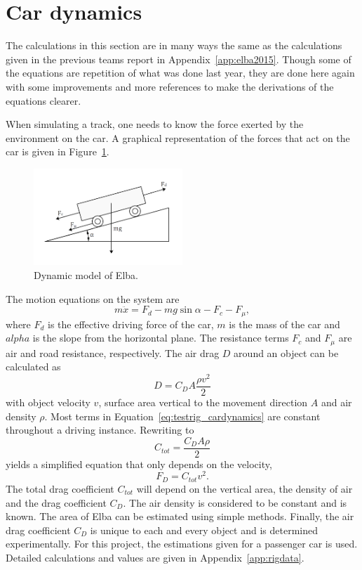 \section{Car dynamics}\label{sec:cardynamics}
The calculations in this section are in many ways the same as the calculations
given in the previous teams report in Appendix~\ref{app:elba2015}. Though some
of the equations are repetition of what was done last year, they are
done here again with some improvements and more references to make the
derivations of the equations clearer.

When simulating a track, one needs to know the force exerted by the environment
on the car. A graphical representation of the forces that act on the car is
given in Figure~\ref{fig:testrig_elbadynamics}.
\begin{figure}[H]
    \centering
    \includegraphics[width=0.5\textwidth]{./img/testrig_elbaforces.png}
    \caption{Dynamic model of Elba.}\label{fig:testrig_elbadynamics}
\end{figure}
The motion equations on the system are 
\begin{equation} \label{eq:testrig_cardynamics}
    m\ddot{x} = F_d - mg\sin{\alpha} - F_c - F_{\mu},
\end{equation}
where $F_d$ is the effective driving force of the car, $m$ is the mass of the
car and $alpha$ is the slope from the horizontal plane. The resistance terms
$F_c$ and $F_{\mu}$ are air and road resistance, respectively. The air drag $D$
around an object can be calculated as~\cite{nakayama2002}
\begin{equation} \label{eq:testrig_airdrag}
    D = C_D A \frac{\rho v^2} {2}
\end{equation}
with object velocity $v$, surface area vertical to the movement direction $A$
and air density $\rho$. Most terms in Equation~\ref{eq:testrig_cardynamics}
are constant throughout a driving instance. Rewriting to
\begin{equation} \label{eq:testrig_csimple}
    C_{tot} = \frac{C_D A \rho} {2}
\end{equation}
yields a simplified equation that only depends on the velocity,
\begin{equation} \label{eq:drag}
    F_D = C_{tot}v^2.
\end{equation}
The total drag coefficient $C_{tot}$ will depend on the vertical area, the density of
air and the drag coefficient $C_D$. The air density is considered to be constant
and is known. The area of Elba can be estimated using simple methods. Finally,
the air drag coefficient $C_D$ is unique to each and every object and is
determined experimentally. For this project, the estimations given for a
passenger car is used. Detailed calculations and values are given in
Appendix~\ref{app:rigdata}. 

